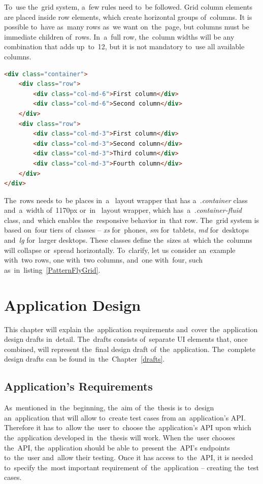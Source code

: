 To~use the~grid system, a~few rules need to~be followed. Grid column elements
are placed inside row elements, which create horizontal groups of~columns. It is
possible to~have as~many rows as~we want on~the~page, but columns must be
immediate children of~rows. In~a~full row, the~column widths will be any
combination that adds up~to~12, but it is not mandatory to~use all available
columns.

\vspace{2mm}
\begin{lstlisting}[caption=An~example of~the~grid system
in~PatternFly.,label=PatternFlyGrid,language=HTML]
<div class="container">
	<div class="row">
		<div class="col-md-6">First column</div>
		<div class="col-md-6">Second column</div>
	</div>
	<div class="row">
		<div class="col-md-3">First column</div>
		<div class="col-md-3">Second column</div>
		<div class="col-md-3">Third column</div>
		<div class="col-md-3">Fourth column</div>
	</div>
</div>
\end{lstlisting}
  
The~rows needs to~be places in~a~ layout wrapper that has
a~\textit{.container} class and~a~width of~1170px or~in~ layout
wrapper, which has~a~\textit{.container-fluid} class, and~which enables
the~responsive behavior in~that row. The~grid system is based on~four tiers
of~classes -- \textit{xs} for~phones, \textit{sm} for~tablets, \textit{md}
for~desktops and~\textit{lg} for~larger desktops. These classes define the~sizes
at~which the~columns will collapse or~spread horizontally. To~clarify, let us
consider an~example with~two rows, one with~two columns, and~one with~four, such
as~in~listing~\ref{PatternFlyGrid}.




\chapter{Application Design}
\label{Design}
This chapter will explain the~application requirements and~cover the~application
design drafts in~detail. The~drafts consists of~separate UI elements that, once
combined, will represent the~final design draft of~the~application. The~complete
design drafts can be found in~the~Chapter~\ref{drafts}.

\section{Application's Requirements}
As~mentioned in~the~beginning, the~aim of~the~thesis is to~design
an~application that will allow to~create test cases from an~application's API.
Therefore it has to~allow the~user to~choose the~application's API upon which
the~application developed in~the~thesis will work. When the~user chooses
the~API, the~application should be able to~present the~API's endpoints
to~the~user and~allow their testing. Once it has access to~the~API, it is
needed to~specify the~most important requirement of~the~application --
creating the~test cases. 

